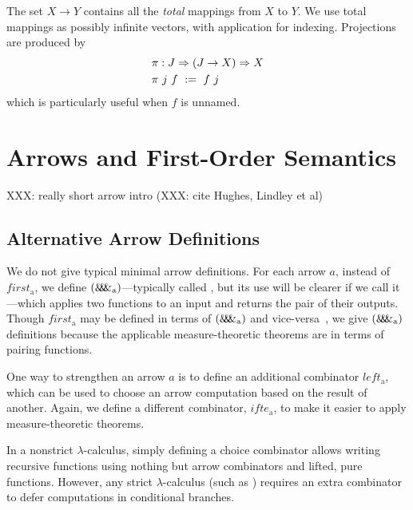 \documentclass[preprint]{sigplanconf}
\newcommand{\arrowpair}{\ensuremath{\mathit{\&\mspace{-7.5mu}\&\mspace{-7.5mu}\&}}}
\newcommand{\arrowif}{\ensuremath{ifte}}
\newcommand{\gen}{_\mathrm{a}}
\begin{document}
The set $X \to Y$ contains all the \emph{total} mappings from $X$ to $Y$.
We use total mappings as possibly infinite vectors, with application for indexing.
Projections are produced by
\begin{equation}
\begin{aligned}
	&\pi : J \Rightarrow (J \to X) \Rightarrow X \\
	&\pi~j~f \ := \ f~j
\end{aligned}
\end{equation}
which is particularly useful when $f$ is unnamed.


\section{Arrows and First-Order Semantics}

XXX: really short arrow intro (XXX: cite Hughes, Lindley et al)

\subsection{Alternative Arrow Definitions}

We do not give typical minimal arrow definitions.
For each arrow $a$, instead of $first\gen$, we define $(\arrowpair\gen)$---typically called , but its use will be clearer if we call it ---which applies two functions to an input and returns the pair of their outputs.
Though $first\gen$ may be defined in terms of $(\arrowpair\gen)$ and vice-versa~\cite{cit:hughes-2005afp-arrows}, we give $(\arrowpair\gen)$ definitions because the applicable measure-theoretic theorems are in terms of pairing functions.

One way to strengthen an arrow $a$ is to define an additional combinator $left\gen$, which can be used to choose an arrow computation based on the result of another.
Again, we define a different combinator, $\arrowif\gen$, to make it easier to apply measure-theoretic theorems.

In a nonstrict $\lambda$-calculus, simply defining a choice combinator allows writing recursive functions using nothing but arrow combinators and lifted, pure functions.
However, any strict $\lambda$-calculus (such as \lzfclang) requires an extra combinator to defer computations in conditional branches.
\end{document}
